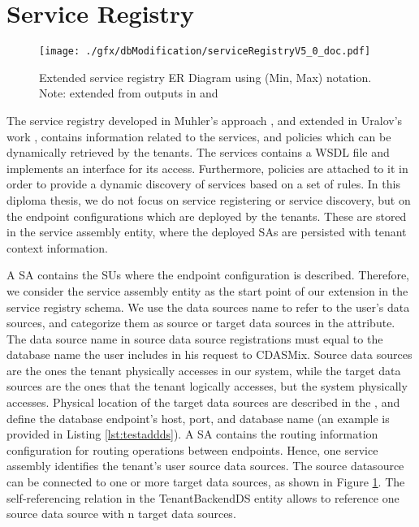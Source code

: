 \section{Service Registry}
\label{sec:serviceregistry}

\begin{figure}[htb]
	\centering
		\texttt{[image: ./gfx/dbModification/serviceRegistryV5\_0\_doc.pdf]}
	\caption[Service Registry ER Diagram]{Extended service registry ER Diagram using (Min, Max) notation. Note: extended from outputs in \cite{Muhler2012} and \cite{Uralov2012}}
	\label{fig:serviceregistry}
\end{figure}

The service registry developed in Muhler's approach \cite{Muhler2012}, and extended in Uralov's work \cite{Uralov2012}, contains information related to the services, and policies which can be dynamically retrieved by the tenants. The services contains a WSDL file and implements an interface for its access. Furthermore, policies are attached to it in order to provide a dynamic discovery of services based on a set of rules. In this diploma thesis, we do not focus on service registering or service discovery, but on the endpoint configurations which are deployed by the tenants. These are stored in the service assembly entity, where the deployed \ac{SA}s are persisted with tenant context information. 

A \ac{SA} contains the \ac{SU}s where the endpoint configuration is described. Therefore, we consider the service assembly entity as the start point of our extension in the service registry schema. We use the data sources name to refer to the user's data sources, and categorize them as source or target data sources in the  attribute. The  data source name in source data source registrations must equal to the database name the user includes in his request to CDASMix. Source data sources are the ones the tenant physically accesses in our system, while the target data sources are the ones that the tenant logically accesses, but the system physically accesses. Physical location of the target data sources are described in the , and define the database endpoint's host, port, and database name (an example is provided in Listing \ref{lst:testaddds}). A \ac{SA} contains the routing information configuration for routing operations between endpoints. Hence, one service assembly identifies the tenant's user source data sources. The source datasource can be connected to one or more target data sources, as shown in Figure \ref{fig:serviceregistry}. The self-referencing relation in the TenantBackendDS entity allows to reference one source data source with n target data sources.

